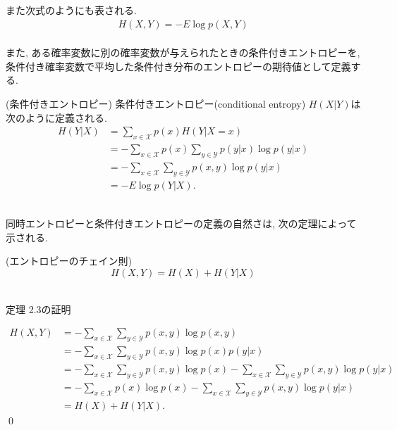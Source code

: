 \documentclass[a4j]{jsarticle}
\begin{document}
また次式のようにも表される.
\begin{align}
	H(X, Y) = - E \log p(X, Y)
\end{align}\\

また, ある確率変数に別の確率変数が与えられたときの条件付きエントロピーを, 条件付き確率変数で平均した条件付き分布のエントロピーの期待値として定義する.\\

\begin{itembox}[l]{ (条件付きエントロピー)}
	条件付きエントロピー(conditional entropy) $H(X|Y)$は次のように定義される.
	\begin{align}
		H(Y | X) & = \sum_{x \in \mathcal{X}} p(x) H(Y | X = x)                                      \\
		         & = - \sum_{x \in \mathcal{X}} p(x) \sum_{y \in \mathcal{Y}} p(y | x) \log p(y | x) \\
		         & = - \sum_{x \in \mathcal{X}} \sum_{y \in \mathcal{Y}} p(x, y) \log p(y | x)       \\
		         & = -E \log p(Y|X).
	\end{align}
\end{itembox}\\

同時エントロピーと条件付きエントロピーの定義の自然さは, 次の定理によって示される.\\

\begin{itembox}[l]{ (エントロピーのチェイン則)}
	\begin{equation}
		H(X, Y) = H(X) + H(Y | X)
	\end{equation}
\end{itembox}\\

 定理 2.3の証明

\begin{align}
	H(X, Y) & = - \sum_{x \in \mathcal{X}} \sum_{y \in \mathcal{Y}} p(x, y) \log p(x, y)                                                                        \\
	        & = - \sum_{x \in \mathcal{X}} \sum_{y \in \mathcal{Y}} p(x, y) \log p(x) p(y | x)                                                                  \\
	        & = - \sum_{x \in \mathcal{X}} \sum_{y \in \mathcal{Y}} p(x, y) \log p(x) - \sum_{x \in \mathcal{X}} \sum_{y \in \mathcal{Y}} p(x, y) \log p(y | x) \\
	        & = - \sum_{x \in \mathcal{X}} p(x) \log p(x)- \sum_{x \in \mathcal{X}} \sum_{y \in \mathcal{Y}} p(x, y) \log p(y | x)                              \\
	        & = H(X) + H(Y|X).
\end{align}\qed\\
\end{document}
